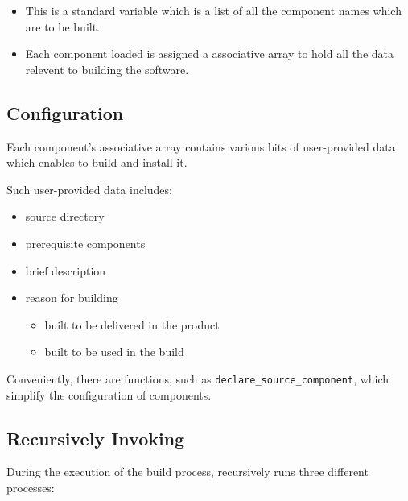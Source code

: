 \begin{itemize}
\item \lmsbwcomponents

  This is a standard \gnumake variable which is a list of all
  the component names which are to be built.

\item {}

  Each component loaded is assigned a \gmsl associative array to
  hold all the data relevent to building the software.
\end{itemize}


\subsection{ Configuration}

Each component's associative array contains various bits of
user-provided data which enables \lmsbw to build and install it.

Such user-provided data includes:

\begin{itemize}
\item source directory
\item prerequisite components
\item brief description
\item reason for building
  \begin{itemize}
  \item built to be delivered in the product
  \item built to be used in the build
  \end{itemize}
\end{itemize}

Conveniently, there are \lmsbw functions, such as
\texttt{declare\_source\_component}, which simplify the configuration
of components.

\subsection{Recursively Invoking \make}

During the execution of the build process, \lmsbw recursively runs
three different \makefile processes:

